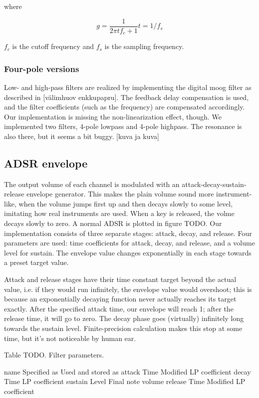 \documentclass[10pt,a4paper,oneside]{article}
\begin{document}
where

\[
  g = \frac{1}{2 \pi t f_c + 1}
  t = 1 / f_s
\]

$f_c$ is the cutoff frequency and $f_s$ is the sampling frequency.


\subsubsection{Four-pole versions}

Low- and high-pass filters are realized by implementing the digital moog filter as described in [välimhuov enkkupapru]. The feedback delay compensation is used, and the filter coefficients (such as the frequency) are compensated accordingly. Our implementation is missing the non-linearization effect, though. We implemented two filters, 4-pole lowpass and 4-pole highpass. The resonance is also there, but it seems a bit buggy. [kuva ja kuva]


\subsection{ADSR envelope}

The output volume of each channel is modulated with an attack-decay-sustain-release envelope generator. This makes the plain volume sound more instrument-like, when the volume jumps first up and then decays slowly to some level, imitating how real instruments are used. When a key is released, the volme decays slowly to zero. A normal ADSR is plotted in figure TODO. Our implementation consists of three separate stages: attack, decay, and release. Four parameters are used: time coefficients for attack, decay, and release, and a volume level for sustain. The envelope value changes exponentially in each stage towards a preset target value.

Attack and release stages have their time constant target beyond the actual value, i.e. if they would run infinitely, the envelope value would overshoot; this is because an exponentially decaying function never actually reaches its target exactly. After the specified attack time, our envelope will reach 1; after the release time, it will go to zero. The decay phase goes (virtually) infinitely long towards the sustain level. Finite-precision calculation makes this stop at some time, but it's not noticeable by human ear.

Table TODO. Filter parameters.

name		Specified as	Used and stored as
attack		Time			Modified LP coefficient
decay		Time			LP coefficient
sustain		Level			Final note volume
release		Time			Modified LP coefficient
\end{document}
